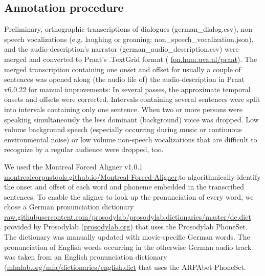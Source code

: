 \documentclass[10pt,a4paper,twocolumn]{article}
\begin{document}
\subsection*{Annotation procedure}
Preliminary, orthographic transcriptions of dialogues (german\_dialog.csv),
non-speech vocalizations (e.g. laughing or groaning;
non\_speech\_vocalization.json), and the audio-description's narrator
(german\_audio\_description.csv) were merged and converted to Praat's
\citep{boersma2019praat} .TextGrid format (
\href{www.fon.hum.uva.nl/praat}{fon.hum.uva.nl/praat}). The merged transcription
containing one onset and offset for usually a couple of sentences was opened
along (the audio file of) the audio-description in Praat v6.0.22 for manual
improvements: In several passes, the approximate temporal onsets and offsets
were corrected. Intervals containing several sentences were split into intervals
containing only one sentence. When two or more persons were speaking
simultaneously the less dominant (background) voice was dropped. Low volume
background speech (especially occurring during music or continuous environmental
noise) or low volume non-speech vocalizations that are difficult to recognize by
a regular audience were dropped, too.

We used the Montreal Forced Aligner v1.0.1
\href{montrealcorpustools.github.io/Montreal-Forced-Aligner}{montrealcorpustools.github.io/Montreal-Forced-Aligner}\citep{mcauliffe2017montreal};to
algorithmically identify the onset and offset of each word and phoneme embedded
in the transcribed sentences. To enable the aligner to look up the pronunciation
of every word, we chose a German pronunciation dictionary
\href{https://raw.githubusercontent.com/prosodylab/prosodylab.dictionaries/master/de.dict}{raw.githubusercontent.com/prosodylab/prosodylab.dictionaries/master/de.dict}
provided by Prosodylab (\href{http://prosodylab.org}{prosodylab.org}) that uses
the Prosodylab PhoneSet. The dictionary was manually updated with movie-specific
German words. The pronunciation of English words occurring in the otherwise
German audio track was taken from an English pronunciation dictionary
(\href{http://mlmlab.org/mfa/dictionaries/english.dict}{mlmlab.org/mfa/dictionaries/english.dict} that uses the ARPAbet PhoneSet.
\end{document}
